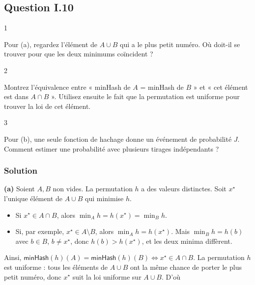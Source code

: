 \documentclass[11pt,a4paper]{article}
\providecommand{\tightlist}{\setlength{\itemsep}{0pt}\setlength{\parskip}{0pt}}
\begin{document}
\hypertarget{question-i.10}{%
\subsection{Question I.10}\label{question-i.10}}

\begin{indication}{1}

Pour (a), regardez l'élément de \(A\cup B\) qui a le plus petit numéro. Où doit-il se trouver pour que les deux minimums coïncident ?

\end{indication}

\begin{indication}{2}

Montrez l'équivalence entre « minHash de \(A\) = minHash de \(B\) » et « cet élément est dans \(A\cap B\) ». Utilisez ensuite le fait que la permutation est uniforme pour trouver la loi de cet élément.

\end{indication}

\begin{indication}{3}

Pour (b), une seule fonction de hachage donne un événement de probabilité \(J\). Comment estimer une probabilité avec plusieurs tirages indépendants ?

\end{indication}

\hypertarget{solution-9}{%
\subsubsection{Solution}\label{solution-9}}

\textbf{(a)} Soient \(A,B\) non vides. La permutation \(h\) a des valeurs distinctes. Soit \(x^\star\) l'unique élément de \(A\cup B\) qui minimise \(h\).

\begin{itemize}
\tightlist
\item
  Si \(x^\star\in A\cap B\), alors \(\min_A h=h(x^\star)=\min_B h\).
\item
  Si, par exemple, \(x^\star\in A\setminus B\), alors \(\min_A h=h(x^\star)\). Mais \(\min_B h=h(b)\) avec \(b\in B\), \(b\neq x^\star\), donc \(h(b)>h(x^\star)\), et les deux minima diffèrent.
\end{itemize}

Ainsi, \(\mathsf{minHash}(h)(A)=\mathsf{minHash}(h)(B)\iff x^\star\in A\cap B\). La permutation \(h\) est uniforme : tous les éléments de \(A\cup B\) ont la même chance de porter le plus petit numéro, donc \(x^\star\) suit la loi uniforme sur \(A\cup B\). D'où
\end{document}
